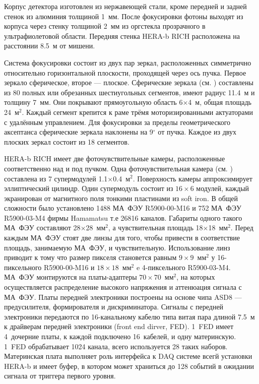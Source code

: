 Корпус детектора изготовлен из нержавеющей стали, кроме передней и задней стенок из алюминия толщиной 1~мм. После фокусировки фотоны выходят из корпуса через стенку толщиной 2~мм из оргстекла прозрачного в ультрафиолетовой области. Передняя стенка HERA-b RICH расположена на расстоянии 8.5~м от мишени.

Система фокусировки состоит из двух пар зеркал, расположенных симметрично относительно горизонтальной плоскости, проходящей через ось пучка. Первое зеркало сферическое, второе --- плоское. Сферические зеркала (см. ) составлены из 80 полных или обрезанных шестиугольных сегментов, имеют радиус 11.4~м и толщину 7~мм. Они покрывают прямоугольную область 6$\times$4~м, общая площадь 24~м$^2$. Каждый сегмент крепится к раме трёмя моторизированными актуаторами с удалённым управлением. Для фокусировки за пределы геометрического аксептанса сферические зеркала наклонены на 9$^\circ$ от пучка. Каждое из двух плоских зеркал состоит из 18 сегментов.

HERA-b RICH имеет две фоточувствительные камеры, расположенные соответственно над и под пучком. Одна фоточувствительная камера (см. ) составлена из 7 супермодулей 1.1$\times$0.4~м$^2$. Поверхность камеры аппроксимирует эллиптический цилиндр. Один супермодуль состоит из $16 \times 6$ модулей, каждый экранирован от магнитного поля тонкими пластинами из soft iron. В общей сложности было установлено 1488 МА~ФЭУ R5900-00-M16 и 752 МА~ФЭУ R5900-03-M4 фирмы Hamamatsu т.е 26816 каналов. Габариты одного такого МА~ФЭУ составляют 28$\times$28~мм$^2$, а чувствительная площадь 18$\times$18~мм$^2$. Перед каждым МА~ФЭУ стоят две линзы для того, чтобы привести в соответствие площадь, занимаемую МА~ФЭУ, и чувствительную. Использование линз приводит к тому что размер пикселя становется равным $9 \times 9$~мм$^2$ у 16-пиксельного R5900-00-M16 и $18 \times 18$~мм$^2$ e 4-пиксельного R5900-03-M4.
МА~ФЭУ монтируются на платы-адаптеры $70 \times 70$~мм$^2$, на которых осуществляется распределение высокого напряжения и аттенюация сигнала с МА~ФЭУ. Платы передней электроники построены на основе чипа ASD8 --- предусилителя, формирователя и дискриминатора. Сигналы с передней электроники передаются по 16-канальному кабелю типа витая пара длиной 7.5~м к драйверам передней электроники (front end dirver, FED). 1~FED имеет 4~дочерние платы, к каждой подключено 16~кабелей, и одну материнскую. 1~FED обрабатывает 1024 канала, всего используется 28 таких наборов. Материнская плата выполняет роль интерфейса к DAQ системе всегй установки HERA-b и имеет буфер, в котором может храниться до 128 событий в ожидании сигнала от триггера первого уровня.

